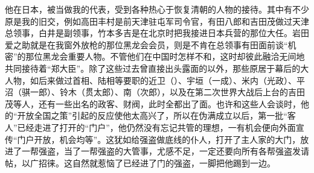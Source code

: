 他在日本，被当做我的代表，受到各种热心于恢复清朝的人物的接待。其中有不少原是我的旧交，例如高田丰村是前天津驻屯军司令官，有田八郎和吉田茂做过天津总领事，白井是副领事，竹本多吉是在北京时把我接进日本兵营的那位大任。岩田爱之助就是在我窗外放枪的那位黑龙会会员，则是不肯在总领事有田面前谈“机密”的那位黑龙会重要人物。不管他们在中国时怎样不和，这时却彼此融洽无间地共同接待着“郑大臣”。除了这些过去曾直接出头露面的以外，那些原居于幕后的大人物，如后来做过首相、陆相等要职的近卫（）、宇垣（一成）、米内（光政）、平沼（骐一郎）、铃木（贯太郎）、南（次郎），以及在第二次世界大战后上台的吉田茂等人，还有一些出名的政客、财阀，此时全都出了面。也许和这些人会谈时，他的“开放全国之策”引起的反应使他太高兴了，所以在伪满成立以后，第一批“客人”已经走进了打开的“门户”，他仍然没有忘记共管的理想，一有机会便向外面宣传“门户开放，机会均等”。这犹如给强盗做底线的仆人，打开了主人家的大门，放进了一帮强盗，当了一帮强盗的大管事，尤感不足，一定还要向所有各帮强盗发请帖，以广招徕。这自然就惹恼了已经进了门的强盗，一脚把他踢到一边。
